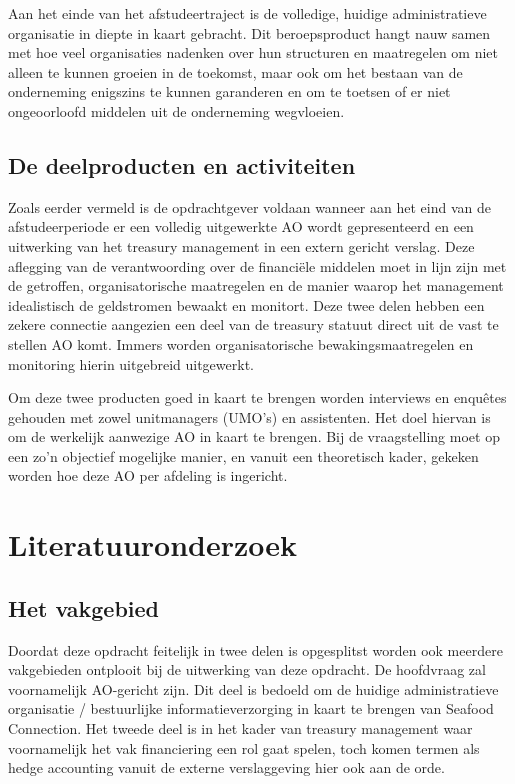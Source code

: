 \documentclass[10pt,a4paper,twoside]{report}
\begin{document}
Aan het einde van het afstudeertraject is de volledige, huidige administratieve organisatie in diepte in kaart gebracht. Dit beroepsproduct hangt nauw samen met hoe veel organisaties nadenken over hun structuren en maatregelen om niet alleen te kunnen groeien in de toekomst, maar ook om het bestaan van de onderneming enigszins te kunnen garanderen en om te toetsen of er niet ongeoorloofd middelen uit de onderneming wegvloeien.

\section{De deelproducten en activiteiten}
Zoals eerder vermeld is de opdrachtgever voldaan wanneer aan het eind van de afstudeerperiode er een volledig uitgewerkte AO wordt gepresenteerd en een uitwerking van het treasury management in een extern gericht verslag. Deze aflegging van de verantwoording over de financiële middelen moet in lijn zijn met de getroffen, organisatorische maatregelen en de manier waarop het management idealistisch de geldstromen bewaakt en monitort. Deze twee delen hebben een zekere connectie aangezien een deel van de treasury statuut direct uit de vast te stellen AO komt. Immers worden organisatorische bewakingsmaatregelen en monitoring hierin uitgebreid uitgewerkt. 

Om deze twee producten goed in kaart te brengen worden interviews en enquêtes gehouden met zowel unitmanagers (UMO’s) en assistenten. Het doel hiervan is om de werkelijk aanwezige AO in kaart te brengen. Bij de vraagstelling moet op een zo’n objectief mogelijke manier, en vanuit een theoretisch kader, gekeken worden hoe deze AO per afdeling is ingericht.

\chapter{Literatuuronderzoek}
\section{Het vakgebied}
Doordat deze opdracht feitelijk in twee delen is opgesplitst worden ook meerdere vakgebieden ontplooit bij de uitwerking van deze opdracht. De hoofdvraag zal voornamelijk AO-gericht zijn. Dit deel is bedoeld om de huidige administratieve organisatie / bestuurlijke informatieverzorging in kaart te brengen van Seafood Connection. Het tweede deel is in het kader van treasury management waar voornamelijk het vak financiering een rol gaat spelen, toch komen termen als hedge accounting vanuit de externe verslaggeving hier ook aan de orde.
\end{document}
